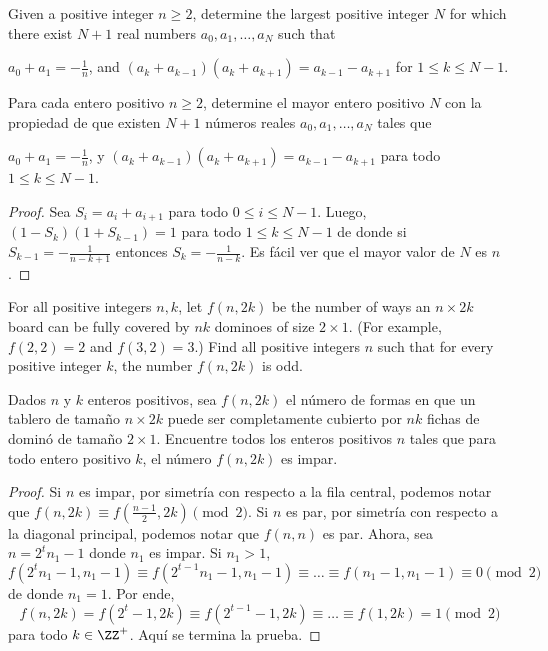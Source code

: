\begin{probEG}[EGMO 2022/4]
	Given a positive integer $n\ge 2$, determine the largest positive integer $N$ for which there exist $N+1$ real numbers $a_0,a_1,\dots,a_N$ such that
	\begin{enumerate}[(1)]
		\ii $a_0+a_1=-\frac1n$, and
		\ii $(a_k+a_{k-1})(a_k+a_{k+1})=a_{k-1}-a_{k+1}$ for $1\le k\le N-1$.
	\end{enumerate}
	\begin{probSP}
		Para cada entero positivo $n\ge 2$, determine el mayor entero positivo $N$ con la propiedad de que existen $N+1$ números reales $a_0,a_1,\dots,a_N$ tales que
		\begin{enumerate}[(1)]
			\ii $a_0+a_1=-\frac1n$, y
			\ii $(a_k+a_{k-1})(a_k+a_{k+1})=a_{k-1}-a_{k+1}$ para todo $1\le k\le N-1$.
		\end{enumerate}
	\end{probSP}
\end{probEG}

\begin{proof}
	Sea $S_i=a_i+a_{i+1}$ para todo $0\le i\le N-1$. Luego, $(1-S_k)(1+S_{k-1})=1$ para todo $1\le k\le N-1$ de donde si $S_{k-1}=-\frac{1}{n-k+1}$ entonces $S_k=-\frac{1}{n-k}$. Es fácil ver que el mayor valor de $N$ es $n$.
\end{proof}

\begin{probEG}[EGMO 2022/5]
	For all positive integers $n,k$, let $f(n,2k)$ be the number of ways an $n\times 2k$ board can be fully covered by $nk$ dominoes of size $2\times 1$. (For example, $f(2,2)=2$ and $f(3,2)=3$.) Find all positive integers $n$ such that for every positive integer $k$, the number $f(n,2k)$ is odd.
	\begin{probSP}
		Dados $n$ y $k$ enteros positivos, sea $f(n,2k)$ el número de formas en que un tablero de tamaño $n\times 2k$ puede ser completamente cubierto por $nk$ fichas de dominó de tamaño $2\times 1$. Encuentre todos los enteros positivos $n$ tales que para todo entero positivo $k$, el número $f(n,2k)$ es impar.
	\end{probSP}
\end{probEG}

\begin{proof}
	Si $n$ es impar, por simetría con respecto a la fila central, podemos notar que $f(n,2k)\equiv f(\frac{n-1}{2},2k)\pmod 2$. Si $n$ es par, por simetría con respecto a la diagonal principal, podemos notar que $f(n,n)$ es par. Ahora, sea $n=2^tn_1-1$ donde $n_1$ es impar. Si $n_1>1$,
	\[f(2^tn_1-1,n_1-1)\equiv f(2^{t-1}n_1-1,n_1-1)\equiv\dots\equiv f(n_1-1,n_1-1)\equiv 0\pmod 2\]
	de donde $n_1=1$. Por ende,
	\[f(n,2k)=f(2^t-1,2k)\equiv f(2^{t-1}-1,2k)\equiv\dots\equiv f(1,2k)=1\pmod 2\]
	para todo $k\in\ZZ^+$. Aquí se termina la prueba.
\end{proof}

